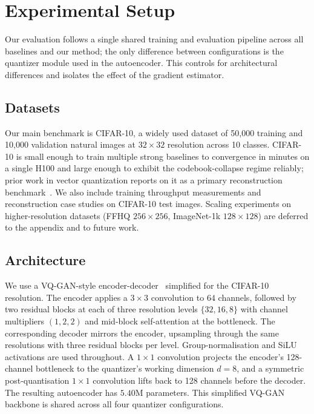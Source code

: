 \section{Experimental Setup}
\label{sec:experimental_setup}

Our evaluation follows a single shared training and evaluation
pipeline across all baselines and our method; the only difference
between configurations is the quantizer module used in the
autoencoder. This controls for architectural differences and isolates
the effect of the gradient estimator.

\subsection{Datasets}

Our main benchmark is CIFAR-10, a widely used dataset of 50,000
training and 10,000 validation natural images at $32 \times 32$
resolution across 10 classes. CIFAR-10 is small enough
to train multiple strong baselines to convergence in minutes on a
single H100 and large enough to exhibit the codebook-collapse regime
reliably; prior work in vector quantization reports on it as a
primary reconstruction benchmark~\citep{mentzer2024fsq}. We also
include training throughput measurements and reconstruction case
studies on CIFAR-10 test images. Scaling experiments on
higher-resolution datasets (FFHQ $256{\times}256$, ImageNet-1k
$128{\times}128$) are deferred to the appendix and to future work.

\subsection{Architecture}

We use a VQ-GAN-style encoder-decoder~\citep{esser2021vqgan,
vandenoord2017vqvae} simplified for the CIFAR-10 resolution. The
encoder applies a $3{\times}3$ convolution to $64$ channels,
followed by two residual blocks at each of three resolution levels
$\{32, 16, 8\}$ with channel multipliers $(1, 2, 2)$ and mid-block
self-attention at the bottleneck. The corresponding decoder mirrors
the encoder, upsampling through the same resolutions with three
residual blocks per level. Group-normalisation and SiLU activations
are used throughout. A $1{\times}1$ convolution projects the
encoder's 128-channel bottleneck to the quantizer's working
dimension $d = 8$, and a symmetric post-quantisation
$1{\times}1$ convolution lifts back to 128 channels before the
decoder. The resulting autoencoder has $5.40$M parameters. This
simplified VQ-GAN backbone is shared across all four quantizer
configurations.

